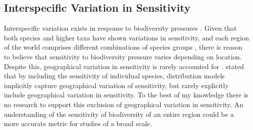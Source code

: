 \documentclass[11pt, a4paper, titlepage]{article}
\begin{document}
   	\subsection*{Interspecific Variation in Sensitivity}
   	 Interspecific variation exists in response to biodiversity pressures \citep{foden2013identifying}. Given that both species and higher taxa \citep{sunday2015species} have shown variations in sensitivity, and each region of the world comprises different combinations of species groups \citep{goethem2021biodiversity}, there is reason to believe that sensitivity to biodiversity pressure varies depending on location. Despite this, geographical variation in sensitivity is rarely accounted for \citep{newbold2020tropical, sala2000global}. \cite{newbold2020tropical} stated that by including the sensitivity of individual species, distribution models implicitly capture geographical variation of sensitivity, but rarely explicitly include geographical variation in sensitivity. To the best of my knowledge there is no research to support this exclusion of geographical variation in sensitivity. An understanding of the sensitivity of biodiversity of an entire region could be a more accurate metric for studies of a broad scale. \newline
\end{document}
